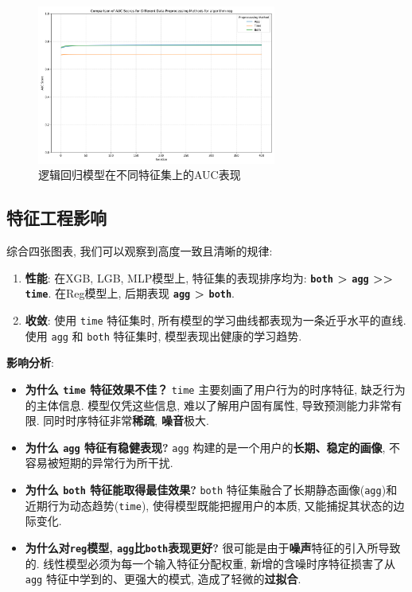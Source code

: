 \documentclass[11pt, a4paper]{article}
\begin{document}
\begin{figure}[H]
    \centering
    \includegraphics[width=0.7\textwidth]{../figs/regauc.png}
    \caption{逻辑回归模型在不同特征集上的AUC表现}
    \label{fig:regauc}
\end{figure}

\subsection{特征工程影响}
综合四张图表, 我们可以观察到高度一致且清晰的规律:
\begin{enumerate}
    \item \textbf{性能}: 在XGB, LGB, MLP模型上, 特征集的表现排序均为: \textbf{\texttt{both} > \texttt{agg} >> \texttt{time}}. 在Reg模型上, 后期表现 \textbf{\texttt{agg} > \texttt{both}}.
    \item \textbf{收敛}: 使用 \texttt{time} 特征集时, 所有模型的学习曲线都表现为一条近乎水平的直线. 使用 \texttt{agg} 和 \texttt{both} 特征集时, 模型表现出健康的学习趋势.
\end{enumerate}

\textbf{影响分析}:
\begin{itemize}
    \item \textbf{为什么 \texttt{time} 特征效果不佳？} \texttt{time} 主要刻画了用户行为的时序特征, 缺乏行为的主体信息. 模型仅凭这些信息, 难以了解用户固有属性, 导致预测能力非常有限. 同时时序特征非常\textbf{稀疏}, \textbf{噪音}极大.
    \item \textbf{为什么 \texttt{agg} 特征有稳健表现?} \texttt{agg} 构建的是一个用户的\textbf{长期、稳定的画像}, 不容易被短期的异常行为所干扰.
    \item \textbf{为什么 \texttt{both} 特征能取得最佳效果?} \texttt{both} 特征集融合了长期静态画像(\texttt{agg})和近期行为动态趋势(\texttt{time}), 使得模型既能把握用户的本质, 又能捕捉其状态的边际变化.
    \item \textbf{为什么对\texttt{reg}模型, \texttt{agg}比\texttt{both}表现更好?} 很可能是由于\textbf{噪声}特征的引入所导致的. 线性模型必须为每一个输入特征分配权重, 新增的含噪时序特征损害了从 \texttt{agg} 特征中学到的、更强大的模式, 造成了轻微的\textbf{过拟合}.
\end{itemize}
\end{document}
